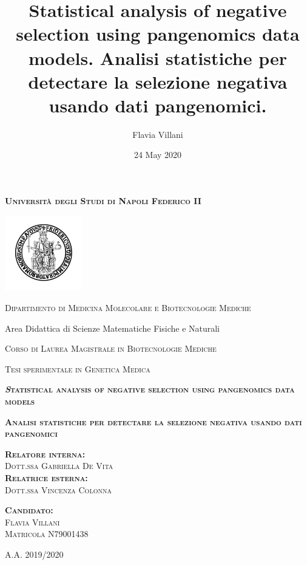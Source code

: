 \documentclass[
tikz,
11pt, %
oneside, %
english, %
singlespacing, %
headsepline, %
]{MastersDoctoralThesisV2} %
\title{Statistical analysis of negative selection using pangenomics data models.
 Analisi statistiche per detectare la selezione negativa usando dati pangenomici.}
\author{Flavia Villani }
\date{24 May 2020}
\begin{document}
\begin{titlepage}
\centering
{\scshape\large\normalfont\bfseries Università degli Studi di Napoli Federico II \par}
 \vspace{0.7cm} 
 \includegraphics[width=0.25\textwidth]{fig/logo.png}
 \par
 \vspace{0.5cm}
\hspace{2cm}
{\scshape\large\normalfont Dipartimento di Medicina Molecolare e Biotecnologie Mediche

Area Didattica di Scienze Matematiche Fisiche e Naturali
 \par}
 \vspace{0.5cm}
{\scshape\large\normalfont Corso di Laurea Magistrale in Biotecnologie Mediche
 \par}
 \vspace{0.5cm} 
{\scshape\large\normalfont Tesi sperimentale in Genetica Medica
 \par}
  \vspace{0.8cm}
{\scshape\large\normalfont\bfseries\textit Statistical analysis of negative selection using pangenomics data models 
 \par}
  \vspace{0.8cm}
{\scshape\large\normalfont\bfseries  Analisi statistiche per detectare la selezione negativa usando dati pangenomici
 \par} 
\vspace{2cm} 
\begin{minipage}{0.45\textwidth}
{\scshape\normalfont\large\bfseries Relatore interna:}\\
{\scshape\normalfont\large Dott.ssa Gabriella De Vita} \\ 
{\scshape\normalfont\large\bfseries Relatrice esterna:} \\
{\scshape\normalfont\large Dott.ssa Vincenza Colonna}\\
\end{minipage}
\hspace{2.5cm}
\begin{minipage}{0.25\textwidth}
{\scshape\normalfont\large\bfseries Candidato:}\\
 {\scshape\normalfont\large Flavia Villani \\
 Matricola N79001438} 
\end{minipage}

\vfill
\centering
\vspace{0.48cm} 
{\scshape\Large\normalfont A.A. 2019/2020}

\end{titlepage}
\end{document}
